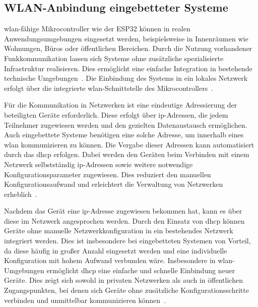 \subsection{WLAN-Anbindung eingebetteter Systeme}
\gls{wlan}-fähige Mikrocontroller wie der ESP32 können in realen Anwendungsumgebungen eingesetzt werden, beispielsweise in Innenräumen wie Wohnungen, Büros oder öffentlichen Bereichen. 
Durch die Nutzung vorhandener Funkkommunikation lassen sich Systeme ohne zusätzliche spezialisierte Infrastruktur realisieren. 
Dies ermöglicht eine einfache Integration in bestehende technische Umgebungen~\cite{hernandez2022wifi}.
Die Einbindung des Systems in ein lokales Netzwerk erfolgt über die integrierte \gls{wlan}-Schnittstelle des Mikrocontrollers~\cite{WaveshareESP32C6}.

Für die Kommunikation in Netzwerken ist eine eindeutige Adressierung der beteiligten Geräte erforderlich. 
Diese erfolgt über \gls{ip}-Adressen, die jedem Teilnehmer zugewiesen werden und den gezielten Datenaustausch ermöglichen. 
Auch eingebettete Systeme benötigen eine solche Adresse, um innerhalb eines \gls{wlan} kommunizieren zu können.
Die Vergabe dieser Adressen kann automatisiert durch das \gls{dhcp} erfolgen. 
Dabei werden den Geräten beim Verbinden mit einem Netzwerk selbstständig \gls{ip}-Adressen sowie weitere notwendige Konfigurationsparameter zugewiesen. 
Dies reduziert den manuellen Konfigurationsaufwand und erleichtert die Verwaltung von Netzwerken erheblich~\cite{dhcp2023}.

Nachdem das Gerät eine \gls{ip}-Adresse zugewiesen bekommen hat, kann es über diese im Netzwerk angesprochen werden.
Durch den Einsatz von \gls{dhcp} können Geräte ohne manuelle Netzwerkkonfiguration in ein bestehendes Netzwerk integriert werden. 
Dies ist insbesondere bei eingebetteten Systemen von Vorteil, da diese häufig in großer Anzahl eingesetzt werden und eine individuelle Konfiguration mit hohem Aufwand verbunden wäre.
Insbesondere in \gls{wlan}-Umgebungen ermöglicht \gls{dhcp} eine einfache und schnelle Einbindung neuer Geräte. 
Dies zeigt sich sowohl in privaten Netzwerken als auch in öffentlichen Zugangspunkten, bei denen sich Geräte ohne zusätzliche Konfigurationsschritte verbinden und unmittelbar kommunizieren können~\cite{dhcp2023}.